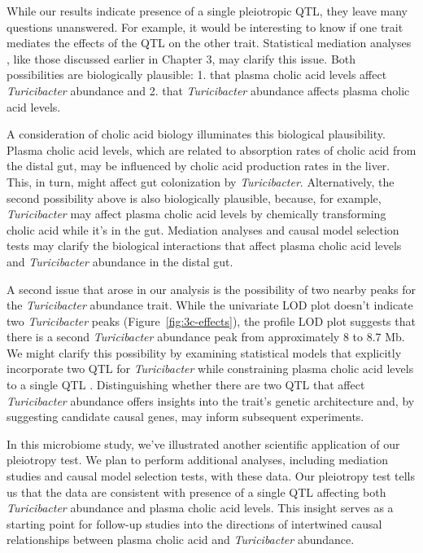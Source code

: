 \documentclass[oneside]{book}\usepackage[]{graphicx}\usepackage[]{color}
\begin{document}
While our results indicate presence of a single pleiotropic QTL, 
they leave many questions unanswered. For example, 
it would be interesting to know if one trait mediates the effects of the QTL on the other trait. 
Statistical mediation analyses \citep{chick2016defining}, 
like those discussed earlier in Chapter 3, may clarify this issue.
Both possibilities are biologically plausible: 1. that plasma cholic acid levels affect \emph{Turicibacter} abundance
and 
2. that \emph{Turicibacter} abundance affects plasma cholic 
acid levels.

A consideration of cholic acid biology illuminates this biological plausibility. 
Plasma cholic acid levels, which are related to 
absorption rates of cholic acid from the distal gut, 
may be influenced by cholic acid production rates in the liver. 
This, in turn, might affect gut colonization by \emph{Turicibacter}. 
Alternatively, the second possibility above is also 
biologically plausible, because, for example, 
\emph{Turicibacter} may affect plasma cholic acid levels by 
chemically transforming cholic acid while it's in the gut. 
Mediation analyses and causal model selection tests \citep{neto2013modeling} may clarify 
the biological interactions that affect plasma cholic 
acid levels and \emph{Turicibacter} abundance in the distal gut.

A second issue that arose in our analysis is the possibility of two nearby peaks 
for the \emph{Turicibacter} abundance trait. 
While the univariate LOD plot doesn't indicate two \emph{Turicibacter} peaks (Figure~\ref{fig:3c-effects}), 
the profile LOD plot suggests that there is a second \emph{Turicibacter} abundance 
peak from approximately 8 to 8.7 Mb. 
We might clarify this possibility by examining statistical models that 
explicitly incorporate two QTL for 
\emph{Turicibacter} while constraining plasma cholic acid levels to 
a single QTL \citep{schadt2005integrative}. Distinguishing whether there are two QTL that affect \emph{Turicibacter} abundance offers insights into the trait's genetic architecture and, by suggesting candidate causal genes, may inform subsequent experiments.

In this microbiome study, we've illustrated another scientific application of our pleiotropy test. 
We plan to perform additional analyses, including 
mediation studies and causal model selection tests, with these data. 
Our pleiotropy test tells us that 
the data are consistent with presence of a single QTL affecting both
\emph{Turicibacter} abundance and plasma cholic acid levels. 
This insight serves as a starting point for follow-up studies into the directions of 
intertwined causal relationships between plasma cholic acid and \emph{Turicibacter} abundance.
\end{document}
